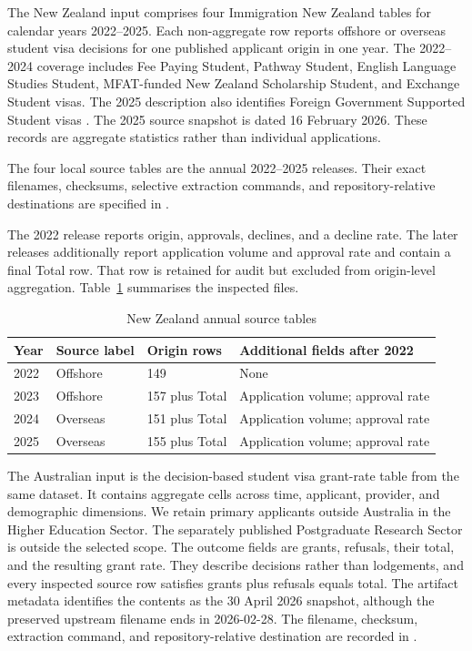 \documentclass[runningheads]{llncs}
\begin{document}
The New Zealand input comprises four Immigration New Zealand tables for calendar years 2022--2025. Each non-aggregate row reports offshore or overseas student visa decisions for one published applicant origin in one year. The 2022--2024 coverage includes Fee Paying Student, Pathway Student, English Language Studies Student, MFAT-funded New Zealand Scholarship Student, and Exchange Student visas. The 2025 description also identifies Foreign Government Supported Student visas \cite{INZStudentVisaDecisions2022,INZStudentVisaDecisions2023,INZStudentVisaDecisions2024,INZStudentVisaDecisions2025}. The 2025 source snapshot is dated 16 February 2026. These records are aggregate statistics rather than individual applications.

The four local source tables are the annual 2022--2025 releases. Their exact filenames, checksums, selective extraction commands, and repository-relative destinations are specified in  \cite{Kaplan2026AUNZComparisonRepository}.

The 2022 release reports origin, approvals, declines, and a decline rate. The later releases additionally report application volume and approval rate and contain a final Total row. That row is retained for audit but excluded from origin-level aggregation. Table~\ref{tab:nz-source-tables} summarises the inspected files.

\begin{table}
\caption{New Zealand annual source tables}
\label{tab:nz-source-tables}
\centering
\small
\begin{tabular}{|l|l|l|l|}
\hline
Year & Source label & Origin rows & Additional fields after 2022 \\
\hline
2022 & Offshore & 149 & None \\
2023 & Offshore & 157 plus Total & Application volume; approval rate \\
2024 & Overseas & 151 plus Total & Application volume; approval rate \\
2025 & Overseas & 155 plus Total & Application volume; approval rate \\
\hline
\end{tabular}
\end{table}

The Australian input is the decision-based student visa grant-rate table from the same dataset. It contains aggregate cells across time, applicant, provider, and demographic dimensions. We retain primary applicants outside Australia in the Higher Education Sector. The separately published Postgraduate Research Sector is outside the selected scope. The outcome fields are grants, refusals, their total, and the resulting grant rate. They describe decisions rather than lodgements, and every inspected source row satisfies grants plus refusals equals total. The artifact metadata identifies the contents as the 30 April 2026 snapshot, although the preserved upstream filename ends in 2026-02-28. The filename, checksum, extraction command, and repository-relative destination are recorded in  \cite{Kaplan2026AUNZComparisonRepository}.
\end{document}
